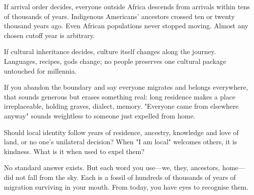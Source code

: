 If arrival order decides, everyone outside Africa descends from arrivals within tens of thousands of years. Indigenous Americans' ancestors crossed ten or twenty thousand years ago. Even African populations never stopped moving. Almost any chosen cutoff year is arbitrary.

If cultural inheritance decides, culture itself changes along the journey. Languages, recipes, gods change; no people preserves one cultural package untouched for millennia.

If you abandon the boundary and say everyone migrates and belongs everywhere, that sounds generous but erases something real: long residence makes a place irreplaceable, holding graves, dialect, memory. "Everyone came from elsewhere anyway" sounds weightless to someone just expelled from home.

Should local identity follow years of residence, ancestry, knowledge and love of land, or no one's unilateral decision? When "I am local" welcomes others, it is kindness. What is it when used to expel them?

No standard answer exists. But each word you use---we, they, ancestors, home---did not fall from the sky. Each is a fossil of hundreds of thousands of years of migration surviving in your mouth. From today, you have eyes to recognise them.
